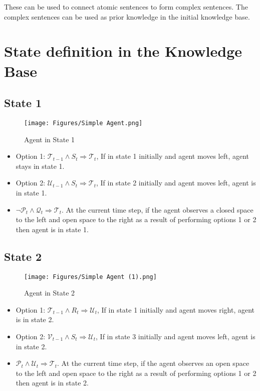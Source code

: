 \documentclass{article}
\begin{document}
These can be used to connect atomic sentences to form complex sentences. The complex sentences can be used as prior knowledge in the initial knowledge base.


\section{State definition in the Knowledge Base}


\subsection{State 1}

\begin{figure}[H]
    \centering
    \texttt{[image: Figures/Simple Agent.png]}
    \caption{Agent in State 1}
    \label{fig:S1}
\end{figure}

\begin{itemize}
    \item Option 1: $ \mathcal{T}_{t-1} \wedge S_t \Rightarrow \mathcal{T}_t $, If in state 1 initially and agent moves left, agent stays in state 1.
    \item Option 2: $ \mathcal{U}_{t-1} \wedge S_t \Rightarrow \mathcal{T}_t $, If in state 2 initially and agent moves left, agent is in state 1.
    \item $\neg \mathcal{P}_t \wedge \mathcal{Q}_t \Rightarrow \mathcal{T}_t$. At the current time step, if the agent observes a closed space to the left and open space to the right as a result of performing options 1 or 2 then agent is in state 1.   
\end{itemize}




\subsection{State 2}


\begin{figure}[H]
    \centering
    \texttt{[image: Figures/Simple Agent (1).png]}
    \caption{Agent in State 2}
    \label{fig:S2}
\end{figure}

\begin{itemize}
    \item Option 1: $ \mathcal{T}_{t-1} \wedge R_t \Rightarrow \mathcal{U}_t $, If in state 1 initially and agent moves right, agent is in state 2.
    \item Option 2: $ \mathcal{V}_{t-1} \wedge S_t \Rightarrow \mathcal{U}_t $, If in state 3 initially and agent moves left, agent is in state 2.
    \item $ \mathcal{P}_t \wedge \mathcal{U}_t \Rightarrow \mathcal{T}_t$. At the current time step, if the agent observes an open space to the left and open space to the right as a result of performing options 1 or 2 then agent is in state 2.   
\end{itemize}
\end{document}
